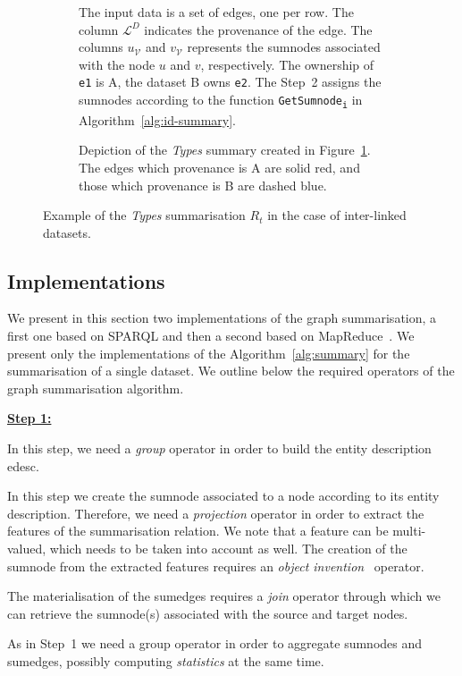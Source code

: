 \begin{figure}
	\centering
	\begin{subfigure}{\textwidth}
		\centering
		\resizebox{\textwidth}{!}{
			
		}
		\caption{The input data is a set of edges, one per row. The column $\mathcal{L}^D$ indicates the provenance of the edge. The columns $u_\mathcal{V}$ and $v_\mathcal{V}$ represents the sumnodes associated with the node $u$ and $v$, respectively. The ownership of \texttt{e1} is A, the dataset B owns \texttt{e2}. The Step~2 assigns the sumnodes according to the function \texttt{GetSumnode\textsubscript{i}} in Algorithm~\ref{alg:id-summary}.}
		\label{tab:id-algo-ex}
	\end{subfigure}
	\quad
	\begin{subfigure}{.8\textwidth}
		\centering
		\resizebox{.8\textwidth}{!}{
			
		}
		\caption{Depiction of the \emph{Types} summary created in Figure~\ref{tab:id-algo-ex}. The edges which provenance is A are solid red, and those which provenance is B are dashed blue.}
		\label{fig:id-algo-ex}
	\end{subfigure}
	\caption{Example of the \emph{Types} summarisation $R_t$ in the case of inter-linked datasets.}
\end{figure}

\subsection{Implementations}

We present in this section two implementations of the graph summarisation, a first one based on SPARQL and then a second based on MapReduce~\cite{dean:2004:msd}. We present only the implementations of the Algorithm~\ref{alg:summary} for the summarisation of a single dataset. We outline below the required operators of the graph summarisation algorithm.
\begin{labeling}{\textbf{\underline{Step 1:}}}
\item[\textbf{\underline{Step 1:}}] In this step, we need a \emph{group} operator in order to build the entity description \gls{edesc}.
\item[\textbf{\underline{Step 2:}}] In this step we create the sumnode associated to a node according to its entity description. Therefore, we need a \emph{projection} operator in order to extract the features of the summarisation relation. We note that a feature can be multi-valued, which needs to be taken into account as well. The creation of the sumnode from the extracted features requires an \emph{object invention}~\cite{hull:1989:usi} operator.
\item[\textbf{\underline{Step 3:}}] The materialisation of the sumedges requires a \emph{join} operator through which we can retrieve the sumnode(s) associated with the source and target nodes.
\item[\textbf{\underline{Step 4:}}] As in Step~1 we need a group operator in order to aggregate sumnodes and sumedges, possibly computing \emph{statistics} at the same time.
\end{labeling}

